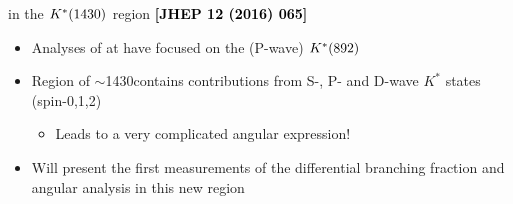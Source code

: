 \documentclass[aspectratio=1610]{beamer}
\def\KstarP  {\ensuremath{\kaon^{*}(892)}\xspace}
\def\Kstarfourteenthirty  {{\ensuremath{\kaon^{*}(1430)}}\xspace}
\begin{document}
\begin{frame}{\BdToKpimm in the \Kstarfourteenthirty region \hspace{0pt plus 1 filll} {\small \bf \textcolor{black}{[JHEP 12 (2016) 065]}}}

\begin{itemize}
\item Analyses of \BdToKpimm at \lhcb have focused on the (P-wave) \KstarP
\item Region of \mkpi $\sim$1430\mevcc contains contributions from S-, P- and D-wave $K^\ast$ states (spin-0,1,2)
\begin{itemize}
  \item Leads to a very complicated angular expression!
\end{itemize}
\end{itemize}

\begin{center}
\end{center}

\begin{itemize}
  \item Will present the first measurements of the differential branching fraction and angular analysis in this new \mkpi region
\end{itemize}

\end{frame}
\end{document}
